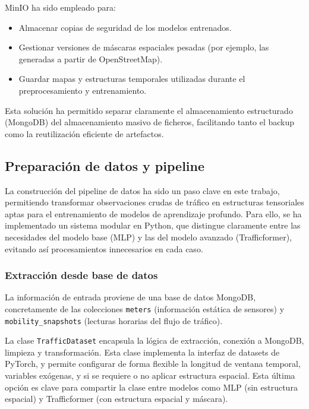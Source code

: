 MinIO ha sido empleado para:

\begin{itemize}
	\item Almacenar copias de seguridad de los modelos entrenados.
	\item Gestionar versiones de máscaras espaciales pesadas (por ejemplo, las generadas a partir de OpenStreetMap).
	\item Guardar mapas y estructuras temporales utilizadas durante el preprocesamiento y entrenamiento.
\end{itemize}

Esta solución ha permitido separar claramente el almacenamiento estructurado (MongoDB) del almacenamiento masivo de ficheros, facilitando tanto el backup como la reutilización eficiente de artefactos.


\subsection{Preparación de datos y pipeline}
\label{sec:prep_datos_pipeline}

La construcción del pipeline de datos ha sido un paso clave en este trabajo, permitiendo transformar observaciones crudas de tráfico en estructuras tensoriales aptas para el entrenamiento de modelos de aprendizaje profundo. Para ello, se ha implementado un sistema modular en Python, que distingue claramente entre las necesidades del modelo base (MLP) y las del modelo avanzado (Trafficformer), evitando así procesamientos innecesarios en cada caso.

\subsubsection*{Extracción desde base de datos}

La información de entrada proviene de una base de datos MongoDB, concretamente de las colecciones \texttt{meters} (información estática de sensores) y \texttt{mobility\_snapshots} (lecturas horarias del flujo de tráfico).

La clase \texttt{TrafficDataset} encapsula la lógica de extracción, conexión a MongoDB, limpieza y transformación. Esta clase implementa la interfaz de datasets de PyTorch, y permite configurar de forma flexible la longitud de ventana temporal, variables exógenas, y si se requiere o no aplicar estructura espacial. Esta última opción es clave para compartir la clase entre modelos como MLP (sin estructura espacial) y Trafficformer (con estructura espacial y máscara).

